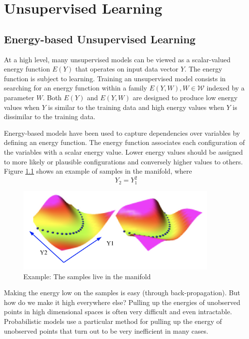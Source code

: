 \chapter{Unsupervised Learning}

\section{Energy-based Unsupervised Learning}

At a high level, many unsupervised models can be viewed as a scalar-valued energy function $E(Y)$ that operates on input data vector $Y$.
The energy function is subject to learning.
Training an unsupervised model consists in searching for an energy function within a family ${E(Y, W), W \in \mathcal{W}}$ indexed by a parameter $W$.
Both $E(Y)$ and $E(Y, W)$  are designed to produce low energy values when $Y$ is similar to the training data and high energy values when $Y$ is dissimilar to the training data.

Energy-based models have been used to capture dependencies over variables by defining an energy function.
The energy function associates each configuration of the variables with a scalar energy value. 
Lower energy values should be assigned to more likely or plausible configurations and conversely higher values to others. Figure \ref{figure1} shows an example of samples in the manifold, where 
\begin{equation}
    Y_2 = Y_1^2
\end{equation}
\begin{figure}[H]
        \centering
        \includegraphics[width=100mm]{figs/pic2.png}
        \caption{Example: The samples live in the manifold}
        \label{figure1}
    \end{figure}
Making the energy low on the samples is easy (through back-propagation). But how do we make it high everywhere else? Pulling up the energies of unobserved points in high dimensional spaces is often very difficult and even intractable. 
Probabilistic models use a particular method for pulling up the energy of unobserved points that turn out to be very inefficient in many cases.

